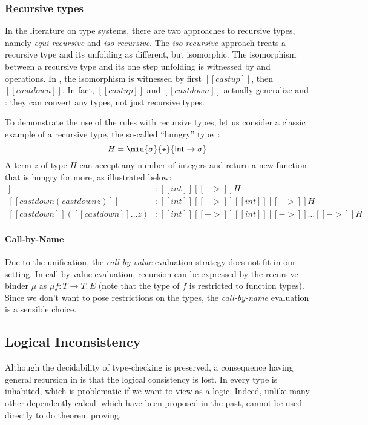 \subsubsection{Recursive types}
In the literature on type systems, there are two approaches to
recursive types, namely \emph{equi-recursive} and
\emph{iso-recursive}. The \emph{iso-recursive} approach treats a
recursive type and its unfolding as different, but isomorphic. The
isomorphism between a recursive type and its one step unfolding is
witnessed by \fold and \unfold operations. In \name, the
isomorphism is witnessed by first $[[castup]]$, then
$[[castdown]]$. In fact, $[[castup]]$ and
$[[castdown]]$ actually generalize \fold and \unfold: they can convert
any types, not just recursive types. 

To demonstrate the use of the
\cast rules with recursive types, let us consider a classic example of a recursive type,
the so-called ``hungry'' type~\cite{tapl}:
\[H = \miu{\sigma}{\star}{\mathsf{Int} \rightarrow \sigma}\]
A term $z$
of type $H$ can accept any number of integers and return a new
function that is hungry for more, as illustrated below:
\begin{align*}
[[castdown z]] &: [[int]][[->]]H  \\
[[castdown(castdown z)]] &: [[int]][[->]][[int]][[->]]H \\
[[castdown]]([[castdown]] \dots z) &: [[int]][[->]][[int]][[->]]\dots[[->]]H
\end{align*}


\paragraph{Call-by-Name}
Due to the unification, the \emph{call-by-value} evaluation strategy
does not fit in our setting. In call-by-value evaluation, recursion
can be expressed by the recursive binder $\mu$ as $\mu f : T
\rightarrow T.\, E$ (note that the type of $f$ is restricted to
function types). Since we don't want to pose restrictions on the
types, the \emph{call-by-name} evaluation is a sensible choice.

\subsection{Logical Inconsistency}
Although the decidability of type-checking is preserved, a consequence
having general recursion in \name is that the logical consistency is
lost. In \name every type is inhabited, which is problematic if we
want to view \name as a logic. Indeed, unlike many other dependently 
calculi which have been proposed in the past, \name cannot be used 
directly to do theorem proving.

